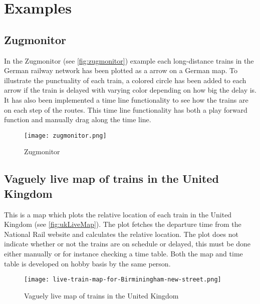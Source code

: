 \pagebreak
\section{Examples}
\label{sect:backgroundExamples}

\subsection{Zugmonitor}
\label{sub:subsection_zugmonitor}

In the Zugmonitor (see \vref{fig:zugmonitor}) example each long-distance 
trains in the German railway network has been plotted as a arrow on a German 
map. To illustrate the punctuality of each train, a colored circle has been 
added to each arrow if the train is delayed with varying color depending on 
how big the delay is. It has also been implemented a time line functionality 
to see how the trains are on each step of the routes. This time line 
functionality has both a play forward function and manually drag along the 
time line.

\begin{figure}[!htbp]
	\texttt{[image: zugmonitor.png]}
	\caption[Zugmonitor]{Zugmonitor \cite{zugmonitor}}
	\label{fig:zugmonitor}
\end{figure}
\pagebreak

\subsection{Vaguely live map of trains in the United Kingdom}
\label{sub:subsection_ukLiveMap}

This is a map which plots the relative location of each train in the United
Kingdom (see \vref{fig:ukLiveMap}). The plot fetches the departure time from the 
National Rail website and calculates the relative location. The plot does not
indicate whether or not the trains are on schedule or delayed, this must be
done either manually or for instance checking a time table\cite{trainTimesUK}.
Both the map and time table is developed on hobby basis by the same person. 

\begin{figure}[!htbp]
	\texttt{[image: live-train-map-for-Birminingham-new-street.png]}
	\caption[Vaguely live map of trains in the United Kingdom]{Vaguely live map of trains in the United Kingdom \cite{ukLiveMap}}
	\label{fig:ukLiveMap}
\end{figure}
\pagebreak

